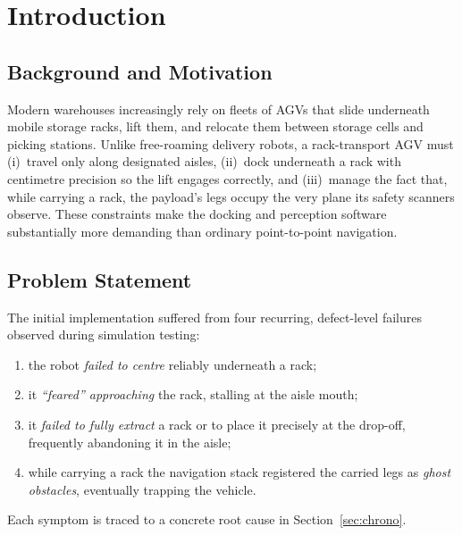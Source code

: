 \documentclass[11pt,a4paper]{article}
\begin{document}
\vspace{0.4cm}
\tableofcontents
\newpage

\section{Introduction}
\subsection{Background and Motivation}
Modern warehouses increasingly rely on fleets of AGVs that slide underneath
mobile storage racks, lift them, and relocate them between storage cells and
picking stations. Unlike free-roaming delivery robots, a rack-transport AGV
must (i)~travel only along designated aisles, (ii)~dock underneath a rack
with centimetre precision so the lift engages correctly, and (iii)~manage the
fact that, while carrying a rack, the payload's legs occupy the very plane
its safety scanners observe. These constraints make the docking and
perception software substantially more demanding than ordinary point-to-point
navigation.

\subsection{Problem Statement}
The initial implementation suffered from four recurring, defect-level
failures observed during simulation testing:
\begin{enumerate}[leftmargin=1.4em,itemsep=1pt]
  \item the robot \emph{failed to centre} reliably underneath a rack;
  \item it \emph{``feared'' approaching} the rack, stalling at the aisle mouth;
  \item it \emph{failed to fully extract} a rack or to place it precisely at
        the drop-off, frequently abandoning it in the aisle;
  \item while carrying a rack the navigation stack registered the carried
        legs as \emph{ghost obstacles}, eventually trapping the vehicle.
\end{enumerate}
Each symptom is traced to a concrete root cause in
Section~\ref{sec:chrono}.
\end{document}
